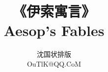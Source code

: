\documentclass[oneside, 17pt]{memoir}
\title{《伊索寓言》\\Aesop's Fables}
\author{沈国状\quad 排版\\OuTlK@QQ.CoM}
\date{}
\begin{document}
    \maketitle
    \newpage
    \begin{multicols}{2}
        {
            \small
            \tableofcontents
        }
    \end{multicols}

    \newpage
    
\end{document}
